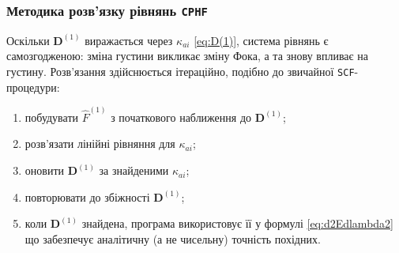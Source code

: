 \subsubsection{Методика розв’язку рівнянь \texttt{CPHF}}

Оскільки $\mathbf D^{(1)}$ виражається через $\kappa_{ai}$ \eqref{eq:D(1)},
система рівнянь є самозгодженою: зміна густини викликає зміну Фока,
а та знову впливає на густину.
Розв’язання здійснюється ітераційно, подібно до звичайної \texttt{SCF}-процедури:
\begin{enumerate}
  \item побудувати $\hat F^{(1)}$ з початкового наближення до $\mathbf D^{(1)}$;
  \item розв’язати лінійні рівняння для $\kappa_{ai}$;
  \item оновити $\mathbf D^{(1)}$ за знайденими $\kappa_{ai}$;
  \item повторювати до збіжності $\mathbf D^{(1)}$;
  \item коли $\mathbf D^{(1)}$ знайдена, програма використовує її у формулі \eqref{eq:d2Edlambda2} що забезпечує аналітичну (а не чисельну) точність похідних.
\end{enumerate}



